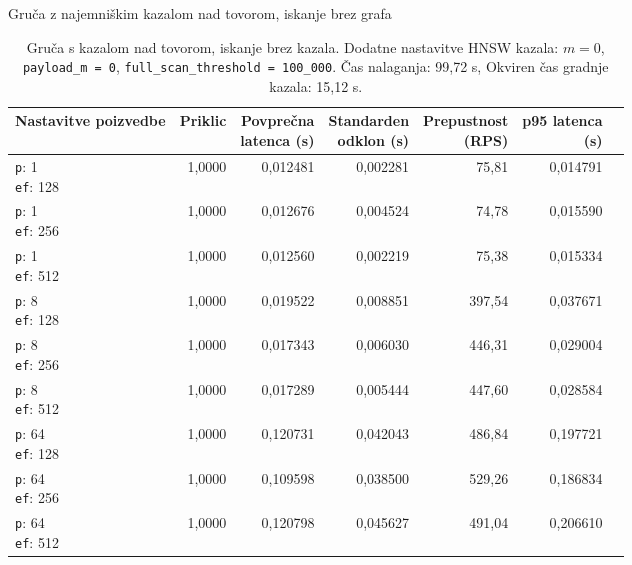 \begin{table}[htbp]
  \centering
\small
  \caption{Gruča z najemniškim kazalom nad tovorom, iskanje brez grafa}
  \label{tab:cluster-2cpu-4ram:tenant-fullscan:qdrant-dipl-baseline-tenant-fullscan-m-16-ef-128-random-768-100-tenants-extended-upload-2026-08-17-22-14-30.json}
  \begin{tabularx}{\textwidth}{Xrrrrrr}
    \toprule
    Nastavitve poizvedbe & Priklic & \makecell{Povprečna\\latenca (s)} & \makecell{Standarden\\odklon (s)} & \makecell{Prepustnost\\(RPS)} & \makecell{p95 latenca\\(s)}  \\
    \midrule
    \makecell{\texttt{p}: 1\\\texttt{ef}: 128} & 1,0000 & 0,012481 & 0,002281 & 75,81 & 0,014791 \\
    \makecell{\texttt{p}: 1\\\texttt{ef}: 256} & 1,0000 & 0,012676 & 0,004524 & 74,78 & 0,015590 \\
    \makecell{\texttt{p}: 1\\\texttt{ef}: 512} & 1,0000 & 0,012560 & 0,002219 & 75,38 & 0,015334 \\
    \makecell{\texttt{p}: 8\\\texttt{ef}: 128} & 1,0000 & 0,019522 & 0,008851 & 397,54 & 0,037671 \\
    \makecell{\texttt{p}: 8\\\texttt{ef}: 256} & 1,0000 & 0,017343 & 0,006030 & 446,31 & 0,029004 \\
    \makecell{\texttt{p}: 8\\\texttt{ef}: 512} & 1,0000 & 0,017289 & 0,005444 & 447,60 & 0,028584 \\
    \makecell{\texttt{p}: 64\\\texttt{ef}: 128} & 1,0000 & 0,120731 & 0,042043 & 486,84 & 0,197721 \\
    \makecell{\texttt{p}: 64\\\texttt{ef}: 256} & 1,0000 & 0,109598 & 0,038500 & 529,26 & 0,186834 \\
    \makecell{\texttt{p}: 64\\\texttt{ef}: 512} & 1,0000 & 0,120798 & 0,045627 & 491,04 & 0,206610 \\
    \bottomrule
  \end{tabularx}
\caption* {Gruča s kazalom nad tovorom, iskanje brez kazala. Dodatne nastavitve HNSW kazala: $m = 0$, \texttt{payload\_m = 0}, \texttt{full\_scan\_threshold = 100\_000}. Čas nalaganja: 99,72 s, Okviren čas gradnje kazala: 15,12 s.}\end{table}

